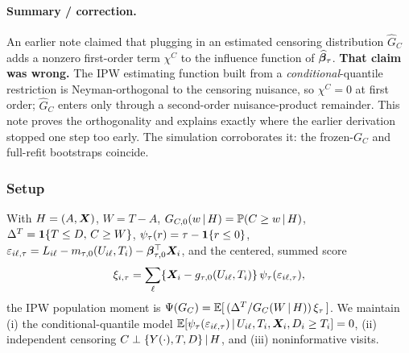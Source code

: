 

\paragraph{Summary / correction.} An earlier note claimed that plugging in an
estimated censoring distribution $\widehat G_C$ adds a nonzero first-order term
$\chi^C$ to the influence function of $\widehat{\bm{\beta}}_\tau$. \textbf{That claim
was wrong.} The IPW estimating function built from a \emph{conditional}-quantile
restriction is Neyman-orthogonal to the censoring nuisance, so $\chi^C=0$ at
first order; $\widehat G_C$ enters only through a second-order nuisance-product
remainder. This note proves the orthogonality and explains exactly where the
earlier derivation stopped one step too early. The simulation corroborates it:
the frozen-$G_C$ and full-refit bootstraps coincide.

\subsubsection{Setup}
With $H=(A,\bm{X})$, $W=T-A$, $G_{C,0}(w\,\vert\, H)=\mathbb{P}(C\ge w\,\vert\, H)$,
$\Delta^T=\mathbf{1}\{T\le D,\,C\ge W\}$, $\psi_\tau(r)=\tau-\mathbf{1}\{r\le0\}$,
$\varepsilon_{i\ell,\tau}=L_{i\ell}-m_{\tau,0}(U_{i\ell},T_i)-\bm{\beta}_{\tau,0}^\top\bm{X}_i$,
and the centered, summed score
\[
\xi_{i,\tau}=\sum_{\ell}\{\bm{X}_i-g_{\tau,0}(U_{i\ell},T_i)\}\,
   \psi_\tau(\varepsilon_{i\ell,\tau}),
\]
the IPW population moment is
$\Psi(G_C)=\mathbb{E}[\,(\Delta^T/G_C(W\,\vert\, H))\,\xi_\tau\,]$. We maintain (i) the
conditional-quantile model
$\mathbb{E}[\psi_\tau(\varepsilon_{i\ell,\tau})\,\vert\, U_{i\ell},T_i,\bm{X}_i,D_i\ge T_i]=0$,
(ii) independent censoring $C\perp\{Y(\cdot),T,D\}\,\vert\, H$, and (iii)
noninformative visits.

